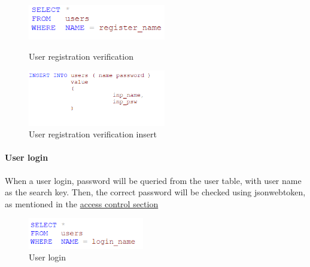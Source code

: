 \begin{CJK*}{UTF8}{gbsn}
\begin{figure}[htbp]
\centering
\begin{minipage}[t]{0.45\textwidth}
\centering
\includegraphics[width=6cm]{reg_ver.png}
\caption{User registration verification}
\end{minipage}
\begin{minipage}[t]{0.45\textwidth}
\centering
\includegraphics[width=6cm]{reg_ins.png}
\caption{User registration verification insert}
\end{minipage}
\end{figure}


\paragraph{User login}
When a user login, password will be queried from the user table, with user name as the search key. Then, the correct password will be checked using jsonwebtoken, as mentioned in the \hyperref[sec:access]{access control section}


\begin{figure}[h]
    \centering
    \includegraphics[width=0.45\textwidth]{login.png}
    \caption{User login}
\end{figure}


\end{CJK*}
